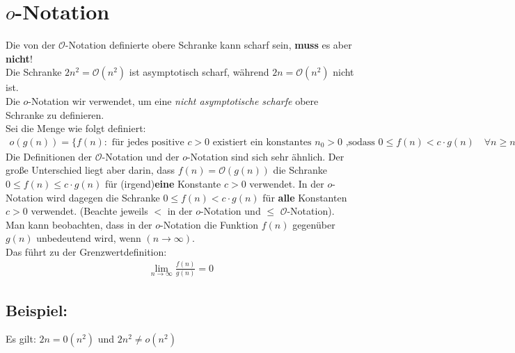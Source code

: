 \documentclass[oneside,11pt,a4paper]{scrartcl}
\renewcommand{\O}{\mathcal{O}}
\begin{document}
\section*{$o$-Notation}
Die von der $\O$-Notation definierte obere Schranke kann scharf sein, \textbf{muss} es aber \textbf{nicht}!\\
Die Schranke $2n^2=\O(n^2)$ ist asymptotisch scharf, während $2n=\O(n^2)$ nicht ist.\\
Die $o$-Notation wir verwendet, um eine \textit{nicht asymptotische scharfe} obere Schranke zu definieren.\\
Sei die Menge wie folgt definiert:
\begin{align*}
o(g(n)) = \{ f(n): \text{ für jedes positive } c > 0 \text{ existiert ein konstantes } n_0 > 0 \text{ ,sodass } 0 \le f(n) < c \cdot g(n) \quad\forall n \ge n_0 \}
\end{align*}
Die Definitionen der $\O$-Notation und der $o$-Notation sind sich sehr ähnlich. Der große Unterschied liegt aber darin, dass $f(n)=\O(g(n))$ die Schranke $0 \le f(n) \mathbf{\le} c \cdot g(n)$ für (irgend)\textbf{eine} Konstante $c >0$ verwendet.
In der $o$-Notation wird dagegen die Schranke $0 \le f(n) \mathbf{<} c \cdot g(n)$ für \textbf{alle} Konstanten $c>0$ verwendet. (Beachte jeweils $<$ in der $o$-Notation und $\le$ $\O$-Notation).\\
Man kann beobachten, dass in der $o$-Notation die Funktion $f(n)$ gegenüber $g(n)$ unbedeutend wird, wenn $(n \to \infty)$.\\
Das führt zu der Grenzwertdefinition:
\begin{align*}
\lim_{n \to \infty}{\frac{f(n)}{g(n)}}=0
\end{align*}
\subsection*{Beispiel:}
Es gilt: $2n = 0(n^2)$ und $2n^2 \neq o(n^2)$
\end{document}
